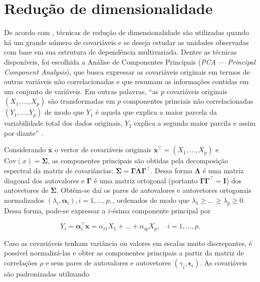 \documentclass[12pt, a4paper, twoside]{report}
\numberwithin{equation}{subsection} %
\begin{document}
 \section{Redução de dimensionalidade}
 
 De acordo com \cite{morettindatasci}, técnicas de redução de dimensionalidade são utilizadas quando há um grande número de covariáveis e se deseja estudar as unidades observadas com base em sua estrutura de dependência multivariada. Dentre as técnicas disponíveis, foi escolhida a Análise de Componentes Principais (\textit{PCA} --- \textit{Principal Component Analysis}), que busca expressar as covariáveis originais em termos de outras variáveis não correlacionadas e que resumam as informações contidas em um conjunto de variáveis. Em outras palavras, ``as $p$ covariáveis originais $(X_1, \dots , X_p)$ são transformadas em $p$ componentes princiais não correlacionadas $(Y_1, \dots, Y_p)$ de modo que $Y_1$ é aquela que explica a maior parcela da variabilidade total dos dados originais, $Y_2$ explica a segunda maior parcila e assim por diante'' \citep{metodosmultivariados_artes}. 
 
Considerando $\boldsymbol{x}$ o vertor de covariáveis originais $\boldsymbol{x}^\top = (X_1, \dots, X_p)$ e $\text{Cov}(x) = \boldsymbol{\Sigma}$, as componentes principais são obtidas pela decomposição espectral da matriz de covariâncias: $\boldsymbol{\Sigma} = \boldsymbol{\Gamma \Lambda \Gamma}^\top$. Dessa forma $\boldsymbol{\Lambda}$ é uma matriz diagonal dos autovalores e $\boldsymbol{\Gamma}$ é uma matriz ortogonal (portanto $\boldsymbol{\Gamma \Gamma}^\top = \boldsymbol{I}$) dos autovetores de $\boldsymbol{\Sigma}$. Obtém-se daí os pares de autovalores e autovetores ortogonais normalizados $(\lambda_i, \boldsymbol{\alpha}_i), i = 1, \dots, p,$, ordenados de modo que $\lambda_1 \geq \dots \geq \lambda_p \geq 0$. Dessa forma, pode-se expressar a $i$-ésima componente principal por

\begin{equation}
	Y_i = \boldsymbol{\alpha}_i^\top \boldsymbol{x} = \alpha_{i1}X_1 + \dots + \alpha_{ip}X_p, \quad i = 1, \dots , p.
\end{equation}

Caso as covariáveis tenham variância ou valores em escalas muito discrepantes, é possível normalizá-las e obter as componentes principais a partir da matriz de correlações $\rho$ e seus pares de autovalores e autovetores $(\gamma_i, \boldsymbol{\epsilon}_i)$. As covariáveis são padronizadas utilizando
\end{document}
